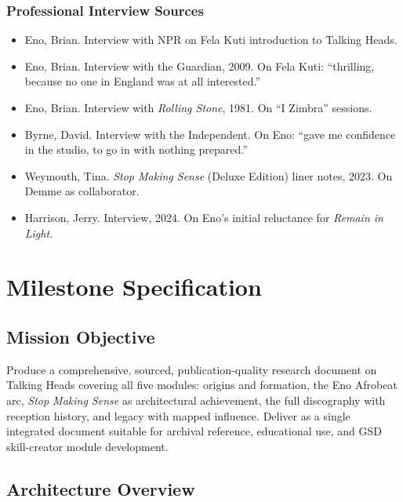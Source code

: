 \documentclass[11pt,letterpaper]{article}
\newcommand{\stageheader}[2]{%
  \noindent\colorbox{#2}{\makebox[\textwidth][l]{%
    \textcolor{white}{\bfseries\sffamily\hspace{6pt}#1\hspace{6pt}}}}%
  \vspace{0.5em}\par%
}
\begin{document}
\subsubsection{Professional Interview Sources}
\begin{itemize}[leftmargin=*]
  \item Eno, Brian. Interview with NPR on Fela Kuti introduction to Talking Heads.
  \item Eno, Brian. Interview with the Guardian, 2009. On Fela Kuti: ``thrilling, because no one in England was at all interested.''
  \item Eno, Brian. Interview with \textit{Rolling Stone}, 1981. On ``I Zimbra'' sessions.
  \item Byrne, David. Interview with the Independent. On Eno: ``gave me confidence in the studio, to go in with nothing prepared.''
  \item Weymouth, Tina. \textit{Stop Making Sense} (Deluxe Edition) liner notes, 2023. On Demme as collaborator.
  \item Harrison, Jerry. Interview, 2024. On Eno's initial reluctance for \textit{Remain in Light}.
\end{itemize}

\newpage

\stageheader{STAGE 3 --- MISSION PACKAGE}{tertiary}

\section{Milestone Specification}

\subsection{Mission Objective}

Produce a comprehensive, sourced, publication-quality research document on Talking Heads covering all five modules: origins and formation, the Eno Afrobeat arc, \textit{Stop Making Sense} as architectural achievement, the full discography with reception history, and legacy with mapped influence. Deliver as a single integrated document suitable for archival reference, educational use, and GSD skill-creator module development.

\subsection{Architecture Overview}
\end{document}
